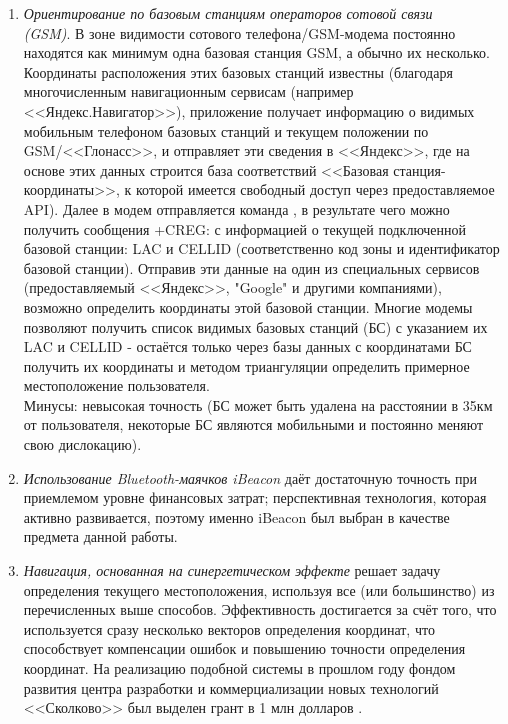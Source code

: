 \begin{enumerate}
    \item
    \textit{Ориентирование по базовым станциям операторов сотовой связи \\(GSM)}. В зоне видимости сотового телефона/GSM-модема постоянно находятся как минимум одна базовая станция GSM, а обычно их несколько. Координаты расположения этих базовых станций известны (благодаря многочисленным навигационным сервисам (например <<Яндекс.На\-ви\-га\-тор>>), приложение получает информацию о видимых мобильным телефоном базовых станций и текущем положении по GSM/<<Глонасс>>, и отправляет эти сведения в <<Яндекс>>, где на основе этих данных строится база соответствий <<Базовая станция-координаты>>, к которой имеется свободный доступ через предоставляемое API). Далее в модем отправляется команда , в результате чего можно получить сообщения +CREG: с информацией о текущей подключенной базовой станции: LAC и CELLID (соответственно код зоны и идентификатор базовой станции). Отправив эти данные на один из специальных сервисов (предоставляемый <<Яндекс>>, "Google" и другими компаниями), возможно определить координаты этой базовой станции. Многие модемы позволяют получить список видимых базовых станций (БС) с указанием их LAC и CELLID - остаётся только через базы данных с координатами БС получить их координаты и методом триангуляции определить примерное местоположение пользователя. \\
    Минусы: невысокая точность (БС может быть удалена на расстоянии в 35км от пользователя, некоторые БС являются мобильными и постоянно меняют свою дислокацию).
    \item
    \textit{Использование Bluetooth-маячков iBeacon} даёт достаточную точность при приемлемом уровне финансовых затрат; перспективная технология, которая активно развивается, поэтому именно iBeacon был выбран в качестве предмета данной работы.
    \item
    \textit{Навигация, основанная на синергетическом эффекте} решает задачу определения текущего местоположения, используя все (или большинство) из перечисленных выше способов. Эффективность достигается за счёт того, что используется сразу несколько векторов определения координат, что способствует компенсации ошибок и повышению точности определения координат. На реализацию подобной системы в прошлом году фондом развития центра разработки и коммерциализации новых технологий <<Сколково>> был выделен грант в 1 млн долларов \cite{web:HabrBig}.    
\end{enumerate}